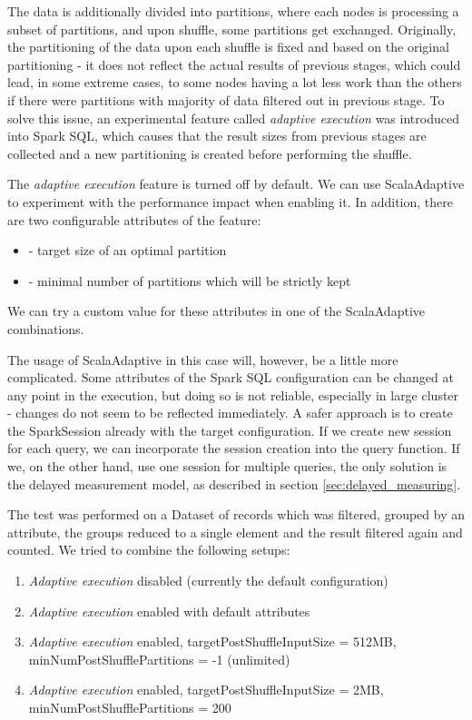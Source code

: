 The data is additionally divided into partitions, where each nodes is processing a subset of partitions, and upon shuffle, some partitions get exchanged. Originally, the partitioning of the data upon each shuffle is fixed and based on the original partitioning - it does not reflect the actual results of previous stages, which could lead, in some extreme cases, to some nodes having a lot less work than the others if there were partitions with majority of data filtered out in previous stage. To solve this issue, an experimental feature called \textit{adaptive execution} was introduced into Spark SQL, which causes that the result sizes from previous stages are collected and a new partitioning is created before performing the shuffle.

The \textit{adaptive execution} feature is turned off by default. We can use ScalaAdaptive to experiment with the performance impact when enabling it. In addition, there are two configurable attributes of the feature:
\begin{itemize}
	\item {} - target size of an optimal partition
	\item {} - minimal number of partitions which will be strictly kept
\end{itemize}
We can try a custom value for these attributes in one of the ScalaAdaptive combinations.

The usage of ScalaAdaptive in this case will, however, be a little more complicated. Some attributes of the Spark SQL configuration can be changed at any point in the execution, but doing so is not reliable, especially in large cluster - changes do not seem to be reflected immediately. A safer approach is to create the SparkSession already with the target configuration. If we create new session for each query, we can incorporate the session creation into the query function. If we, on the other hand, use one session for multiple queries, the only solution is the delayed measurement model, as described in section \ref{sec:delayed_measuring}. 

The test was performed on a Dataset of records which was filtered, grouped by an attribute, the groups reduced to a single element and the result filtered again and counted. We tried to combine the following setups:

\begin{enumerate}
	\item \textit{Adaptive execution} disabled (currently the default configuration)
	\item \textit{Adaptive execution} enabled with default attributes
	\item \textit{Adaptive execution} enabled, 
	targetPostShuffleInputSize = 512MB, 
	minNumPostShufflePartitions = -1 (unlimited)
	\item \textit{Adaptive execution} enabled, targetPostShuffleInputSize = 2MB, minNumPostShufflePartitions = 200
\end{enumerate}

